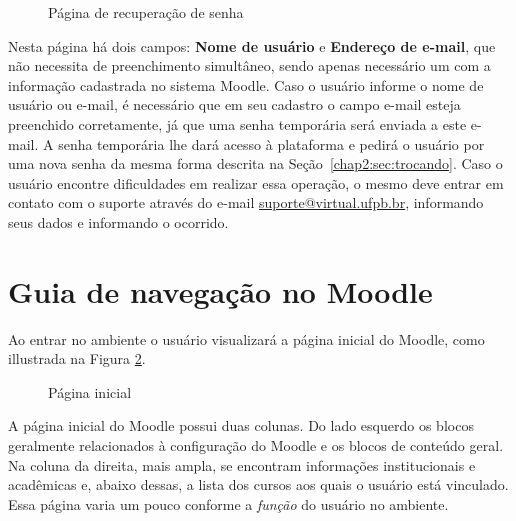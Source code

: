 \begin{figure}[htbp]
 \begin{center}
  \caption{Página de recuperação de senha}
  \label{fig:recupera senha}
 \end{center}
\end{figure}
Nesta página há dois campos: \textbf{Nome de usuário} e \textbf{Endereço de e-mail}, que não necessita de preenchimento simultâneo, sendo apenas necessário um com a informação cadastrada no sistema Moodle. Caso o usuário informe o nome de usuário ou e-mail, é necessário que em seu cadastro o campo e-mail esteja preenchido corretamente, já que uma senha temporária será enviada a este e-mail. A senha temporária lhe dará acesso à plataforma e pedirá o usuário por uma nova senha da mesma forma descrita na Seção~\ref{chap2:sec:trocando}. 
Caso o usuário encontre dificuldades em realizar essa operação, o mesmo deve entrar em contato com o suporte através do e-mail \url{suporte@virtual.ufpb.br}, informando seus dados e informando o ocorrido.

\section{Guia de navegação no Moodle}
Ao entrar no ambiente o usuário visualizará a página inicial do Moodle, como illustrada na Figura \ref{fig:inicio}.

\begin{figure}[htbp]
 \begin{center}
  \caption{Página inicial}
  \label{fig:inicio}
 \end{center}
\end{figure}
A página inicial do Moodle possui duas colunas. Do lado esquerdo os blocos geralmente relacionados à configuração do Moodle e os blocos de conteúdo geral. Na coluna da direita, mais ampla, se encontram informações institucionais e acadêmicas e, abaixo dessas, a lista dos cursos aos quais o usuário está vinculado. Essa página varia um pouco conforme a \emph{função} do usuário no ambiente.

